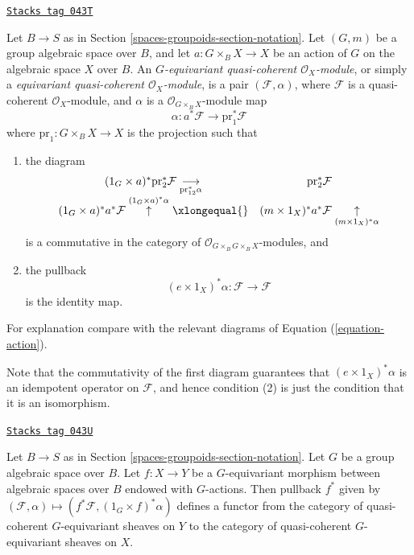 \begin{definition}
\label{spaces-groupoids-definition-equivariant-module}
\href{https://stacks.math.columbia.edu/tag/043T}{\texttt{Stacks tag 043T}}

Let $B \to S$ as in Section \ref{spaces-groupoids-section-notation}.
Let $(G, m)$ be a group algebraic space over $B$, and
let $a : G \times_B X \to X$ be an action of $G$
on the algebraic space $X$ over $B$.
An {\it $G$-equivariant quasi-coherent $\mathcal{O}_X$-module},
or simply a {\it equivariant quasi-coherent $\mathcal{O}_X$-module},
is a pair $(\mathcal{F}, \alpha)$, where $\mathcal{F}$ is a quasi-coherent
$\mathcal{O}_X$-module, and $\alpha$ is a $\mathcal{O}_{G \times_B X}$-module
map
$$
\alpha : a^*\mathcal{F} \longrightarrow \text{pr}_1^*\mathcal{F}
$$
where $\text{pr}_1 : G \times_B X \to X$ is the projection
such that
\begin{enumerate}
\item the diagram
$$
\begin{array}{cc}(1_G \times a)^*\text{pr}_2^*\mathcal{F} \underset{\text{pr}_{12}^*\alpha}{\longrightarrow} & \text{pr}_2^*\mathcal{F} \\ (1_G \times a)^*a^*\mathcal{F} \overset{(1_G \times a)^*\alpha}{\uparrow}\xlongequal{} & (m \times 1_X)^*a^*\mathcal{F} \underset{(m \times 1_X)^*\alpha}{\uparrow}\end{array}
$$
is a commutative in the category of
$\mathcal{O}_{G \times_B G \times_B X}$-modules, and
\item the pullback
$$
(e \times 1_X)^*\alpha : \mathcal{F} \longrightarrow \mathcal{F}
$$
is the identity map.
\end{enumerate}
For explanation compare with the relevant diagrams of
Equation (\ref{equation-action}).
\end{definition}

Note that the commutativity of the first diagram guarantees that
$(e \times 1_X)^*\alpha$ is an idempotent operator on $\mathcal{F}$,
and hence condition (2) is just the condition that it is an isomorphism.

\begin{lemma}
\label{spaces-groupoids-lemma-pullback-equivariant}
\href{https://stacks.math.columbia.edu/tag/043U}{\texttt{Stacks tag 043U}}

Let $B \to S$ as in Section \ref{spaces-groupoids-section-notation}.
Let $G$ be a group algebraic space over $B$.
Let $f : X \to Y$ be a $G$-equivariant morphism between
algebraic spaces over $B$ endowed with $G$-actions.
Then pullback $f^*$ given by
$(\mathcal{F}, \alpha) \mapsto (f^*\mathcal{F}, (1_G \times f)^*\alpha)$
defines a functor from the category of quasi-coherent $G$-equivariant sheaves
on $Y$ to the category of quasi-coherent $G$-equivariant sheaves on $X$.
\end{lemma}

